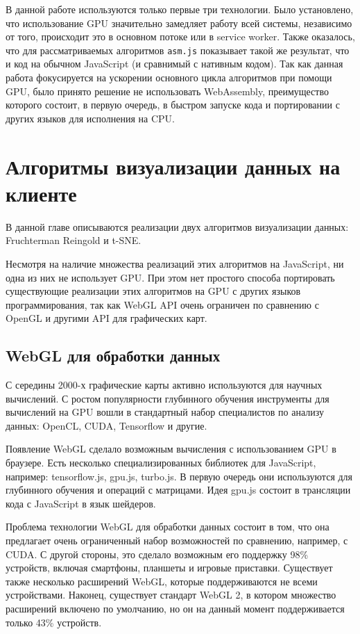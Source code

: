 В данной работе используются только первые три технологии. Было установлено, что использование GPU значительно замедляет работу всей системы, независимо от того, происходит это в основном потоке или в service worker. Также оказалось, что для рассматриваемых алгоритмов \texttt{asm.js} показывает такой же результат, что и код на обычном JavaScript (и сравнимый с нативным кодом). Так как данная работа фокусируется на ускорении основного цикла алгоритмов при помощи GPU, было принято решение не использовать WebAssembly, преимущество которого состоит, в первую очередь, в быстром запуске кода и портировании с других языков для исполнения на CPU.

\chapter{Алгоритмы визуализации данных на клиенте}

В данной главе описываются реализации двух алгоритмов визуализации данных: Fruchterman Reingold и t-SNE.

Несмотря на наличие множества реализаций этих алгоритмов на JavaScript, ни одна из них не использует GPU. При этом нет простого способа портировать существующие реализации этих алгоритмов на GPU с других языков программирования, так как WebGL API очень ограничен по сравнению с OpenGL и другими API для графических карт.

\section{WebGL для обработки данных}
\label{sec:webgl_data_analysis}

С середины 2000-х графические карты активно используются для научных вычислений. С ростом популярности глубинного обучения инструменты для вычислений на GPU вошли в стандартный набор специалистов по анализу данных: OpenCL, CUDA, Tensorflow и другие.

Появление WebGL сделало возможным вычисления с использованием GPU в браузере. Есть несколько специализированных библиотек для JavaScript, например: tensorflow.js, gpu.js, turbo.js. В первую очередь они используются для глубинного обучения и операций с матрицами. Идея gpu.js состоит в трансляции кода с JavaScript в язык шейдеров.

Проблема технологии WebGL для обработки данных состоит в том, что она предлагает очень ограниченный набор возможностей по сравнению, например, с CUDA. С другой стороны, это сделало возможным его поддержку 98\% устройств, включая смартфоны, планшеты и игровые приставки. Существует также несколько расширений WebGL, которые поддерживаются не всеми устройствами. Наконец, существует стандарт WebGL 2, в котором множество расширений включено по умолчанию, но он на данный момент поддерживается только 43\% устройств.


